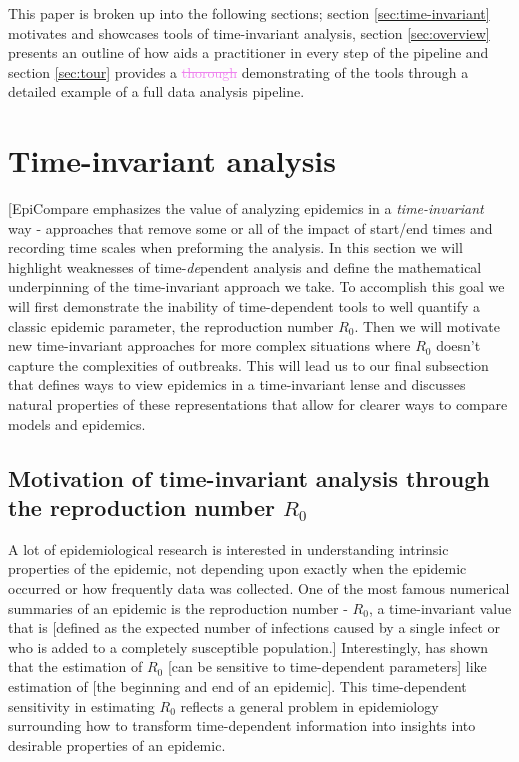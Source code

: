 \documentclass[
  shortnames]{jss}
\begin{document}
This paper is broken up into the following sections; section
\ref{sec:time-invariant} motivates and showcases tools of time-invariant
analysis, section \ref{sec:overview} presents an outline of how
 aids a practitioner in every step of the pipeline and
section \ref{sec:tour} provides a \textcolor{violet}{\sout{thorough}}
demonstrating of the tools through a detailed example of a full data
analysis pipeline.

\hypertarget{time-invariant-analysis}{%
\section{Time-invariant analysis}\label{time-invariant-analysis}}

{[}EpiCompare emphasizes the value of analyzing epidemics in a
\textit{time-invariant} way - approaches that remove some or all of the
impact of start/end times and recording time scales when preforming the
analysis. In this section we will highlight weaknesses of
time-\textit{de}pendent analysis and define the mathematical
underpinning of the time-invariant approach we take. To accomplish this
goal we will first demonstrate the inability of time-dependent tools to
well quantify a classic epidemic parameter, the reproduction number
\(R_0\). Then we will motivate new time-invariant approaches for more
complex situations where \(R_0\) doesn't capture the complexities of
outbreaks. This will lead us to our final subsection that defines ways
to view epidemics in a time-invariant lense and discusses natural
properties of these representations that allow for clearer ways to
compare models and epidemics.

\subsection[Motivation through the reproduction number $R_0$]{Motivation
of time-invariant analysis through the reproduction number
\(R_0\)}\label{sec:r0_subsection}

A lot of epidemiological research is interested in understanding
intrinsic properties of the epidemic, not depending upon exactly when
the epidemic occurred or how frequently data was collected. One of the
most famous numerical summaries of an epidemic is the reproduction
number - \(R_0\), a time-invariant value that is {[}defined as the
expected number of infections caused by a single infect or who is added
to a completely susceptible population.{]} Interestingly,
\citet{Gallagher2020} has shown that the estimation of \(R_0\) {[}can be
sensitive to time-dependent parameters{]} like estimation of {[}the
beginning and end of an epidemic{]}. This time-dependent sensitivity in
estimating \(R_0\) reflects a general problem in epidemiology
surrounding how to transform time-dependent information into insights
into desirable properties of an epidemic.
\end{document}
